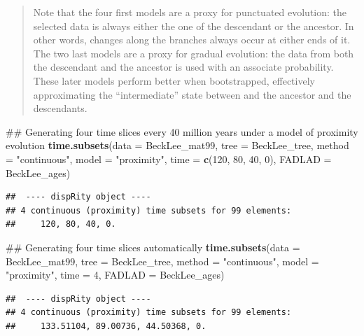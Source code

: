 \documentclass[]{book}
\newenvironment{Shaded}{\begin{snugshade}}{\end{snugshade}}
\newcommand{\KeywordTok}[1]{\textcolor[rgb]{0.13,0.29,0.53}{\textbf{#1}}}
\newcommand{\DataTypeTok}[1]{\textcolor[rgb]{0.13,0.29,0.53}{#1}}
\newcommand{\DecValTok}[1]{\textcolor[rgb]{0.00,0.00,0.81}{#1}}
\newcommand{\StringTok}[1]{\textcolor[rgb]{0.31,0.60,0.02}{#1}}
\newcommand{\NormalTok}[1]{#1}
\theoremstyle{definition}
\theoremstyle{definition}
\theoremstyle{remark}
\begin{document}
\begin{quote}
Note that the four first models are a proxy for punctuated evolution:
the selected data is always either the one of the descendant or the
ancestor. In other words, changes along the branches always occur at
either ends of it. The two last models are a proxy for gradual
evolution: the data from both the descendant and the ancestor is used
with an associate probability. These later models perform better when
bootstrapped, effectively approximating the ``intermediate'' state
between and the ancestor and the descendants.
\end{quote}

\begin{Shaded}
\begin{Highlighting}[]
\NormalTok{## Generating four time slices every 40 million years under a model of proximity evolution}
\KeywordTok{time.subsets}\NormalTok{(}\DataTypeTok{data =}\NormalTok{ BeckLee_mat99, }\DataTypeTok{tree =}\NormalTok{ BeckLee_tree, }
    \DataTypeTok{method =} \StringTok{"continuous"}\NormalTok{, }\DataTypeTok{model =} \StringTok{"proximity"}\NormalTok{, }\DataTypeTok{time =} \KeywordTok{c}\NormalTok{(}\DecValTok{120}\NormalTok{, }\DecValTok{80}\NormalTok{, }\DecValTok{40}\NormalTok{, }\DecValTok{0}\NormalTok{),}
    \DataTypeTok{FADLAD =}\NormalTok{ BeckLee_ages)}
\end{Highlighting}
\end{Shaded}

\begin{verbatim}
##  ---- dispRity object ---- 
## 4 continuous (proximity) time subsets for 99 elements:
##     120, 80, 40, 0.
\end{verbatim}

\begin{Shaded}
\begin{Highlighting}[]
\NormalTok{## Generating four time slices automatically}
\KeywordTok{time.subsets}\NormalTok{(}\DataTypeTok{data =}\NormalTok{ BeckLee_mat99, }\DataTypeTok{tree =}\NormalTok{ BeckLee_tree,}
    \DataTypeTok{method =} \StringTok{"continuous"}\NormalTok{, }\DataTypeTok{model =} \StringTok{"proximity"}\NormalTok{, }\DataTypeTok{time =} \DecValTok{4}\NormalTok{, }\DataTypeTok{FADLAD =}\NormalTok{ BeckLee_ages)}
\end{Highlighting}
\end{Shaded}

\begin{verbatim}
##  ---- dispRity object ---- 
## 4 continuous (proximity) time subsets for 99 elements:
##     133.51104, 89.00736, 44.50368, 0.
\end{verbatim}
\end{document}
